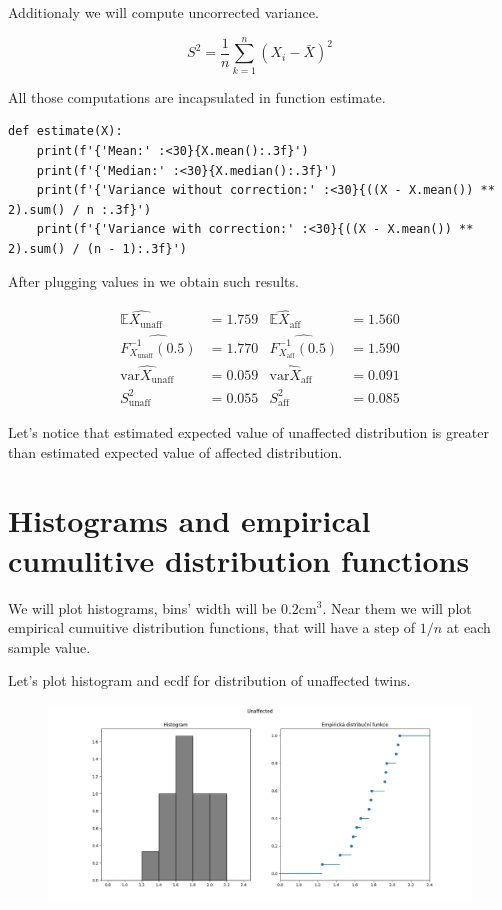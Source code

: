 \documentclass[12pt,a4paper]{article} %
\newcommand{\randv}[2][X]{#1_{\text{#2}}}
\newcommand{\E}{\mathbb{E}}
\newcommand{\var}{\text{var}}
\begin{document}
  Additionaly we will compute uncorrected variance.

\begin{equation*}
  S^2 = \frac{1}{n} \sum_{k = 1}^n(X_i - \bar{X})^2
\end{equation*}

  All those computations are incapsulated in function estimate.

\begin{lstlisting}[basicstyle=\scriptsize]
def estimate(X):
    print(f'{'Mean:' :<30}{X.mean():.3f}')
    print(f'{'Median:' :<30}{X.median():.3f}')
    print(f'{'Variance without correction:' :<30}{((X - X.mean()) ** 2).sum() / n :.3f}')
    print(f'{'Variance with correction:' :<30}{((X - X.mean()) ** 2).sum() / (n - 1):.3f}')
\end{lstlisting}

  After plugging values in we obtain such results.

\begin{align*}
  \widehat{\E\randv{unaff}} &= 1.759 & \widehat{\E\randv{aff}} &= 1.560 \\
  \widehat{F^{-1}_{\randv{unaff}}(0.5)} &= 1.770 & \widehat{F^{-1}_{\randv{aff}}(0.5)} &= 1.590 \\
  \widehat{\var\randv{unaff}} &= 0.059 & \widehat{\var\randv{aff}} &= 0.091 \\
  S^2_{\text{unaff}} &= 0.055 & S^2_{\text{aff}} &= 0.085
\end{align*}

Let's notice that estimated expected value of unaffected distribution is greater than estimated expected value of affected distribution.

\pagebreak
\section{Histograms and empirical cumulitive distribution functions}

We will plot histograms, bins' width will be $0.2 \text{cm}^3$. Near them we will plot empirical cumuitive distribution functions, that will have a step of $1/n$ at each sample value.

Let's plot histogram and ecdf for distribution of unaffected twins.

\begin{figure}[h]
  \centering
  \includegraphics[scale=0.4]{./img/unaffected_hist_ecdf.png}
  \label{fig:unaff_ecdf}
\end{figure}
\end{document}
